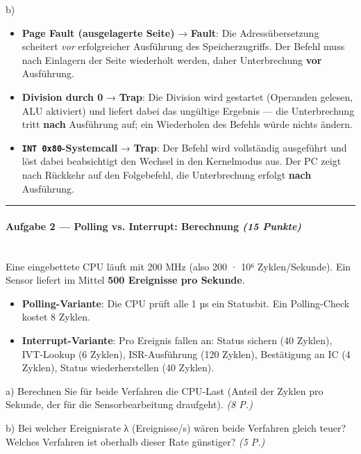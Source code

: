 \documentclass[11pt, a4paper]{article}
\begin{document}
b)

\begin{itemize}
  \item \textbf{Page Fault (ausgelagerte Seite)} → \textbf{Fault}: Die Adressübersetzung scheitert \textit{vor} erfolgreicher Ausführung des Speicherzugriffs. Der Befehl muss nach Einlagern der Seite wiederholt werden, daher Unterbrechung \textbf{vor} Ausführung.
  \item \textbf{Division durch 0} → \textbf{Trap}: Die Division wird gestartet (Operanden gelesen, ALU aktiviert) und liefert dabei das ungültige Ergebnis — die Unterbrechung tritt \textbf{nach} Ausführung auf; ein Wiederholen des Befehls würde nichts ändern.
  \item \textbf{\texttt{INT 0x80}-Systemcall} → \textbf{Trap}: Der Befehl wird vollständig ausgeführt und löst dabei beabsichtigt den Wechsel in den Kernelmodus aus. Der PC zeigt nach Rückkehr auf den Folgebefehl, die Unterbrechung erfolgt \textbf{nach} Ausführung.
\end{itemize}


\noindent\textcolor{rulegray}{\rule{\linewidth}{0.4pt}}


\paragraph{Aufgabe 2 — Polling vs. Interrupt: Berechnung \textit{(15 Punkte)}}\mbox{}\\[2pt]

Eine eingebettete CPU läuft mit 200 MHz (also 200 · 10⁶ Zyklen/Sekunde). Ein Sensor liefert im Mittel \textbf{500 Ereignisse pro Sekunde}.


\begin{itemize}
  \item \textbf{Polling-Variante}: Die CPU prüft alle 1 µs ein Statusbit. Ein Polling-Check kostet 8 Zyklen.
  \item \textbf{Interrupt-Variante}: Pro Ereignis fallen an: Status sichern (40 Zyklen), IVT-Lookup (6 Zyklen), ISR-Ausführung (120 Zyklen), Bestätigung an IC (4 Zyklen), Status wiederherstellen (40 Zyklen).
\end{itemize}

a) Berechnen Sie für beide Verfahren die CPU-Last (Anteil der Zyklen pro Sekunde, der für die Sensorbearbeitung draufgeht). \textit{(8 P.)}


b) Bei welcher Ereignisrate λ (Ereignisse/s) wären beide Verfahren gleich teuer? Welches Verfahren ist oberhalb dieser Rate günstiger? \textit{(5 P.)}
\end{document}
